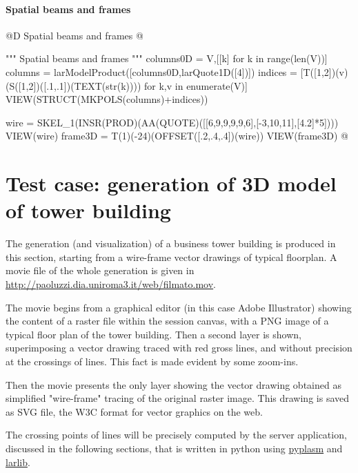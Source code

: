 \documentclass[11pt,oneside]{article}    %
\begin{document}
\paragraph{Spatial beams and frames}
@D Spatial beams and frames
@{""" Spatial beams and frames """
columns0D = V,[[k] for k in range(len(V))]
columns = larModelProduct([columns0D,larQuote1D([4])])
indices = [T([1,2])(v)(S([1,2])([.1,.1])(TEXT(str(k)))) for k,v in enumerate(V)]
VIEW(STRUCT(MKPOLS(columns)+indices))

wire = SKEL_1(INSR(PROD)(AA(QUOTE)([[6,9,9,9,9,6],[-3,10,11],[4.2]*5])))
VIEW(wire)
frame3D = T(1)(-24)(OFFSET([.2,.4,.4])(wire))
VIEW(frame3D)
@}

\section{Test case: generation of 3D model of tower building}\label{sec:library}

The generation (and visualization) of a business tower building is produced in this section, starting from a wire-frame vector drawings of typical floorplan. A movie file of the whole generation is given in \href{http://paoluzzi.dia.uniroma3.it/web/filmato.mov}{http://paoluzzi.dia.uniroma3.it/web/filmato.mov}.

The movie begins from a graphical editor (in this case Adobe Illustrator) showing the content of a  raster file  within the session canvas, with a PNG image of a typical floor plan of the tower building. Then a second layer is shown, superimposing a vector drawing traced with red gross lines, and without precision at the crossings of lines. This fact is made evident by some zoom-ins. 

Then the movie presents the only layer showing the vector drawing obtained as simplified "wire-frame"  tracing of the original raster image. This drawing is saved as SVG file, the W3C format for vector graphics on the web.

The crossing points of lines will be precisely computed by the server application, discussed in the following sections, that is written in python using \href{https://github.com/plasm-language/pyplasm}{pyplasm} and \href{https://github.com/cvdlab/lar-cc}{larlib}.
\end{document}
